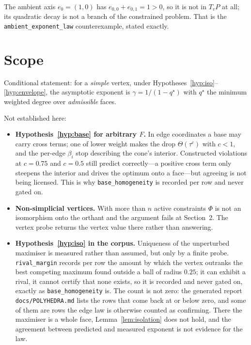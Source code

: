 \documentclass[11pt]{article}
\theoremstyle{definition}
\theoremstyle{remark}
\begin{document}
The ambient axis $e_0=(1,0)$ has $e_{0,0}+e_{0,1}=1>0$, so it is not in
$T_vP$ at all; its quadratic decay is not a branch of the constrained problem.
That is the \texttt{ambient\_exponent\_law} counterexample, stated exactly.

\section{Scope}

Conditional statement: for a \emph{simple} vertex, under
Hypotheses~\ref{hyp:iso}--\ref{hyp:envelope}, the asymptotic exponent is
$\gamma=1/(1-q^\star)$ with $q^\star$ the minimum weighted degree over
\emph{admissible} faces.

Not established here:

\begin{itemize}
  \item \textbf{Hypothesis~\ref{hyp:base} for arbitrary $F$.} In edge
        coordinates a base may carry cross terms; one of lower weight makes
        the drop $\Theta(\tau^{c})$ with $c<1$, and the per-edge $\beta_i$
        stop describing the cone's interior. Constructed violations at
        $c=0.75$ and $c=0.5$ still predict correctly---a positive cross term
        only steepens the interior and drives the optimum onto a face---but
        agreeing is not being licensed. This is why
        \texttt{base\_homogeneity} is recorded per row and never gated on.
  \item \textbf{Non-simplicial vertices.} With more than $n$ active
        constraints $\Phi$ is not an isomorphism onto the orthant and the
        argument fails at Section~2. The vertex probe returns the vertex value
        there rather than answering.
  \item \textbf{Hypothesis~\ref{hyp:iso} in the corpus.} Uniqueness of the
        unperturbed maximiser is measured rather than assumed, but only by a
        finite probe. \texttt{rival\_margin} records per row the amount by
        which the vertex outranks the best competing maximum found outside a
        ball of radius $0.25$; it can exhibit a rival, it cannot certify that
        none exists, so it is recorded and never gated on, exactly as
        \texttt{base\_homogeneity} is. The count is not zero: the generated
        report \texttt{docs/POLYHEDRA.md} lists the rows that come back at or
        below zero, and some of them are rows the edge law is otherwise
        counted as confirming. There the maximiser is a whole face,
        Lemma~\ref{lem:isolation} does not hold, and the agreement between
        predicted and measured exponent is not evidence for the law.
\end{itemize}
\end{document}
